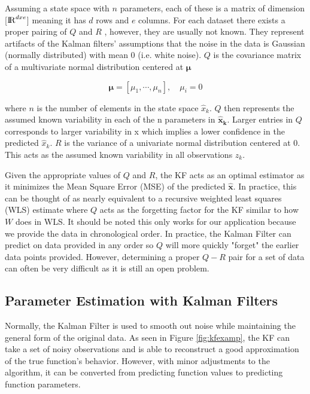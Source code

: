 Assuming a state space with $n$ parameters, each of these is a matrix of dimension [${\rm I\!R}^{dxe}$] meaning it has $d$ rows and $e$ columns. For each dataset there exists a proper pairing of $Q$ and $R$ , however, they are usually not known. They represent artifacts of the Kalman filters' assumptions that the noise in the data is Gaussian (normally distributed) with mean 0 (i.e. white noise). $Q$ is the covariance matrix of a multivariate normal distribution centered at $\bm{\mu}$

\begin{equation}
    \bm{\mu} = [\mu_{1}, \cdots , \mu_{n}], \quad \mu_{i} = 0
\end{equation}

 where $n$ is the number of elements in the state space $\hat{x}_{k}$. $Q$ then represents the assumed known variability in each of the n parameters in $\bm{\hat{x}_{k}}$. Larger entries in $Q$ corresponds to larger variability in x which implies a lower confidence in the predicted $\hat{x}_{k}$. $R$ is the variance of a univariate normal distribution centered at 0. This acts as the assumed known variability in all observations $z_{k}$.

Given the appropriate values of $Q$ and $R$, the KF acts as an optimal estimator as it minimizes the Mean Square Error (MSE) of the predicted $\bm{\hat{x}}$. In practice, this can be thought of as nearly equivalent to a recursive weighted least squares (WLS) estimate where $Q$ acts as the forgetting factor for the KF similar to how $W$ does in WLS. It should be noted this only works for our application because we provide the data in chronological order. In practice, the Kalman Filter can predict on data provided in any order so $Q$ will more quickly "forget" the earlier data points provided. However, determining a proper $Q-R$ pair for a set of data can often be very difficult as it is still an open problem.

\subsection{Parameter Estimation with Kalman Filters}
Normally, the Kalman Filter is used to smooth out noise while maintaining the general form of the original data. As seen in Figure \ref{fig:kfexamp}, the KF can take a set of noisy observations and is able to reconstruct a good approximation of the true function's behavior. However, with minor adjustments to the algorithm, it can be converted from predicting function values to predicting function parameters.

